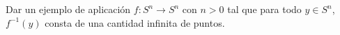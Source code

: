 \documentclass[twoside]{article}
\begin{document}
\newpage

\begin{ejercicio}{}
Dar un ejemplo de aplicación $f:S^n\to S^n$ con $n>0$ tal que para todo $y\in S^{n}$, $f^{-1}(y)$ consta de una cantidad infinita de puntos. 
\end{ejercicio}
\begin{solucion}

\end{solucion}

\newpage


%
%
%
\end{document}
